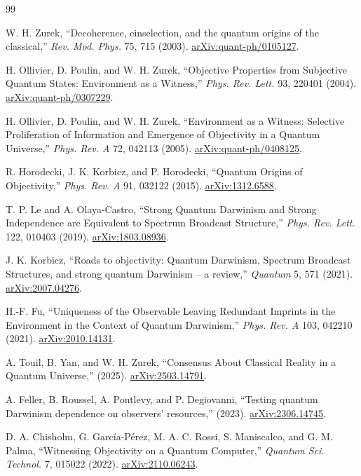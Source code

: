 \begin{thebibliography}{99}

W. H. Zurek, ``Decoherence, einselection, and the quantum origins of the classical,'' \emph{Rev. Mod. Phys.} 75, 715 (2003). \href{https://arxiv.org/abs/quant-ph/0105127}{arXiv:quant-ph/0105127}.

H. Ollivier, D. Poulin, and W. H. Zurek, ``Objective Properties from Subjective Quantum States: Environment as a Witness,'' \emph{Phys. Rev. Lett.} 93, 220401 (2004). \href{https://arxiv.org/abs/quant-ph/0307229}{arXiv:quant-ph/0307229}.

H. Ollivier, D. Poulin, and W. H. Zurek, ``Environment as a Witness: Selective Proliferation of Information and Emergence of Objectivity in a Quantum Universe,'' \emph{Phys. Rev. A} 72, 042113 (2005). \href{https://arxiv.org/abs/quant-ph/0408125}{arXiv:quant-ph/0408125}.

R. Horodecki, J. K. Korbicz, and P. Horodecki, ``Quantum Origins of Objectivity,'' \emph{Phys. Rev. A} 91, 032122 (2015). \href{https://arxiv.org/abs/1312.6588}{arXiv:1312.6588}.

T. P. Le and A. Olaya-Castro, ``Strong Quantum Darwinism and Strong Independence are Equivalent to Spectrum Broadcast Structure,'' \emph{Phys. Rev. Lett.} 122, 010403 (2019). \href{https://arxiv.org/abs/1803.08936}{arXiv:1803.08936}.

J. K. Korbicz, ``Roads to objectivity: Quantum Darwinism, Spectrum Broadcast Structures, and strong quantum Darwinism -- a review,'' \emph{Quantum} 5, 571 (2021). \href{https://arxiv.org/abs/2007.04276}{arXiv:2007.04276}.

H.-F. Fu, ``Uniqueness of the Observable Leaving Redundant Imprints in the Environment in the Context of Quantum Darwinism,'' \emph{Phys. Rev. A} 103, 042210 (2021). \href{https://arxiv.org/abs/2010.14131}{arXiv:2010.14131}.

A. Touil, B. Yan, and W. H. Zurek, ``Consensus About Classical Reality in a Quantum Universe,'' (2025). \href{https://arxiv.org/abs/2503.14791}{arXiv:2503.14791}.

A. Feller, B. Roussel, A. Pontlevy, and P. Degiovanni, ``Testing quantum Darwinism dependence on observers' resources,'' (2023). \href{https://arxiv.org/abs/2306.14745}{arXiv:2306.14745}.

D. A. Chisholm, G. Garc\'ia-P\'erez, M. A. C. Rossi, S. Maniscalco, and G. M. Palma, ``Witnessing Objectivity on a Quantum Computer,'' \emph{Quantum Sci. Technol.} 7, 015022 (2022). \href{https://arxiv.org/abs/2110.06243}{arXiv:2110.06243}.


\end{thebibliography}
